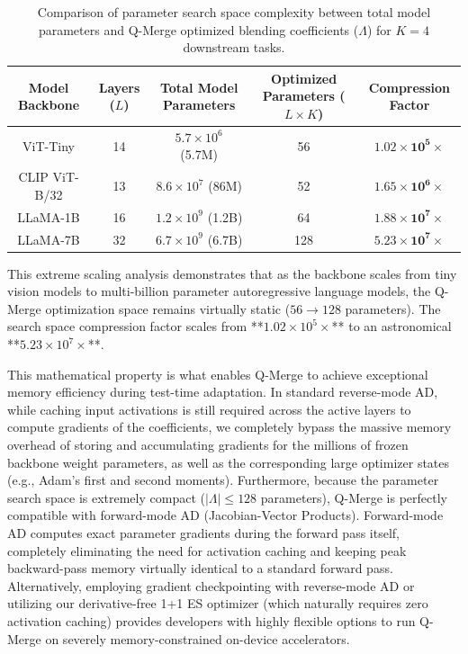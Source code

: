 \begin{table}[h]
\centering
\caption{Comparison of parameter search space complexity between total model parameters and Q-Merge optimized blending coefficients ($\Lambda$) for $K=4$ downstream tasks.}
\label{tab:search_space_complexity}
\vskip 0.1in
\setlength{\tabcolsep}{3.5pt}
\footnotesize
\begin{tabular}{ccccc}
\toprule
\textbf{Model Backbone} & \textbf{Layers ($L$)} & \textbf{Total Model Parameters} & \textbf{Optimized Parameters ($L \times K$)} & \textbf{Compression Factor} \\
\midrule
ViT-Tiny & 14 & $5.7 \times 10^6$ (5.7M) & 56 & $\mathbf{1.02 \times 10^5 \times}$ \\
CLIP ViT-B/32 & 13 & $8.6 \times 10^7$ (86M) & 52 & $\mathbf{1.65 \times 10^6 \times}$ \\
LLaMA-1B & 16 & $1.2 \times 10^9$ (1.2B) & 64 & $\mathbf{1.88 \times 10^7 \times}$ \\
LLaMA-7B & 32 & $6.7 \times 10^9$ (6.7B) & 128 & $\mathbf{5.23 \times 10^7 \times}$ \\
\bottomrule
\end{tabular}
\end{table}

This extreme scaling analysis demonstrates that as the backbone scales from tiny vision models to multi-billion parameter autoregressive language models, the Q-Merge optimization space remains virtually static ($56 \to 128$ parameters). 
The search space compression factor scales from **$1.02 \times 10^5 \times$** to an astronomical **$5.23 \times 10^7 \times$**. 

This mathematical property is what enables Q-Merge to achieve exceptional memory efficiency during test-time adaptation. In standard reverse-mode AD, while caching input activations is still required across the active layers to compute gradients of the coefficients, we completely bypass the massive memory overhead of storing and accumulating gradients for the millions of frozen backbone weight parameters, as well as the corresponding large optimizer states (e.g., Adam's first and second moments). Furthermore, because the parameter search space is extremely compact ($|\Lambda| \le 128$ parameters), Q-Merge is perfectly compatible with forward-mode AD (Jacobian-Vector Products). Forward-mode AD computes exact parameter gradients during the forward pass itself, completely eliminating the need for activation caching and keeping peak backward-pass memory virtually identical to a standard forward pass. Alternatively, employing gradient checkpointing with reverse-mode AD or utilizing our derivative-free 1+1 ES optimizer (which naturally requires zero activation caching) provides developers with highly flexible options to run Q-Merge on severely memory-constrained on-device accelerators.

